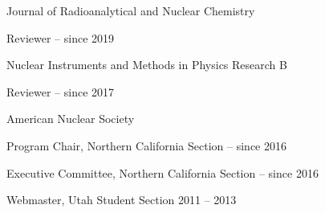 \begin{list1}
\item[] Journal of Radioanalytical and Nuclear Chemistry
\begin{list2}
\item Reviewer \hfill{ -- since 2019}
\end{list2}
\item[] Nuclear Instruments and Methods in Physics Research B  
\begin{list2}
\item Reviewer \hfill{ -- since 2017}
\end{list2}
\item[] American Nuclear Society  
\begin{list2}
\item Program Chair, Northern California Section \hfill{ -- since 2016}
\item Executive Committee, Northern California Section \hfill{ -- since 2016}
\item Webmaster, Utah Student Section \hfill{2011 --  2013}
\end{list2}
\end{list1}
